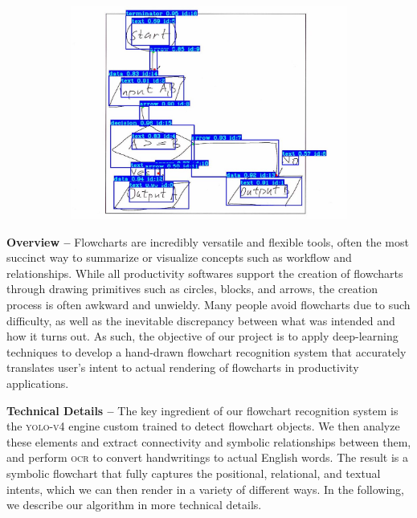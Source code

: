 \documentclass[10pt]{article}
\begin{document}
\begin{figure}[h]
\begin{subfigure}{0.32\columnwidth}
\end{subfigure}
\begin{subfigure}{0.32\columnwidth}
\includegraphics[width=\columnwidth]{fc_03.jpeg}
\end{subfigure}
\end{figure}

{\bf Overview --}\phantom{i}
Flowcharts are incredibly versatile and flexible tools, often the most
succinct way to summarize or visualize concepts such as workflow and
relationships.
While all productivity softwares support the creation of flowcharts through
drawing primitives such as circles, blocks, and arrows, the creation
process is often awkward and unwieldy.  Many people avoid flowcharts due to such
difficulty, as well as the inevitable discrepancy between what was intended and how it
turns out. As such, 
the objective of our project is to apply deep-learning techniques to develop a
hand-drawn flowchart recognition system
that accurately translates user's intent to actual rendering of flowcharts in
productivity applications.

{\bf Technical Details --}\phantom{i}
The key ingredient of our flowchart recognition system is the
\textsc{yolo-v4} engine custom trained to detect flowchart objects.
We then analyze these elements and extract connectivity and
symbolic relationships between them, and perform \textsc{ocr} to convert
handwritings to actual English words. The result is a symbolic flowchart that fully
captures the positional, relational, and textual intents, which we can then render
in a variety of different ways.
In the following, we describe our algorithm in more technical details.
\end{document}
